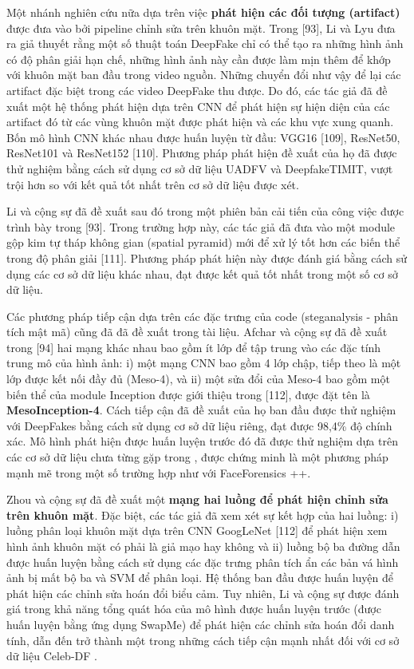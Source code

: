 \documentclass{article}
\begin{document}
Một nhánh nghiên cứu nữa dựa trên việc \textbf{phát hiện các đối tượng (artifact)} được đưa vào bởi pipeline chỉnh sửa trên khuôn mặt. Trong [93], Li và Lyu đưa ra giả thuyết rằng một số thuật toán DeepFake chỉ có thể tạo ra những hình ảnh có độ phân giải hạn chế, những hình ảnh này cần được làm mịn thêm để khớp với khuôn mặt ban đầu trong video nguồn. Những chuyển đổi như vậy để lại các artifact đặc biệt trong các video DeepFake thu được. Do đó, các tác giả đã đề xuất một hệ thống phát hiện dựa trên CNN để phát hiện sự hiện diện của các artifact đó từ các vùng khuôn mặt được phát hiện và các khu vực xung quanh. Bốn mô hình CNN khác nhau được huấn luyện từ đầu: VGG16 [109], ResNet50, ResNet101 và ResNet152 [110]. Phương pháp phát hiện đề xuất của họ đã được thử nghiệm bằng cách sử dụng cơ sở dữ liệu UADFV và DeepfakeTIMIT, vượt trội hơn so với kết quả tốt nhất trên cơ sở dữ liệu được xét.

Li và cộng sự đã đề xuất sau đó trong  một phiên bản cải tiến của công việc được trình bày trong [93]. Trong trường hợp này, các tác giả đã đưa vào một module gộp kim tự tháp không gian (spatial pyramid) mới để xử lý tốt hơn các biến thể trong độ phân giải [111]. Phương pháp phát hiện này được đánh giá bằng cách sử dụng các cơ sở dữ liệu khác nhau, đạt được kết quả tốt nhất trong một số cơ sở dữ liệu.

Các phương pháp tiếp cận dựa trên các đặc trưng của code (steganalysis - phân tích mật mã) cũng đã đã đề xuất trong tài liệu. Afchar và cộng sự đã đề xuất trong [94] hai mạng khác nhau bao gồm ít lớp để tập trung vào các đặc tính trung mô của hình ảnh: i) một mạng CNN bao gồm 4 lớp chập, tiếp theo là một lớp được kết nối đầy đủ (Meso-4), và ii) một sửa đổi của Meso-4 bao gồm một biến thể của module Inception được giới thiệu trong [112], được đặt tên là \textbf{MesoInception-4}. Cách tiếp cận đã đề xuất của họ ban đầu được thử nghiệm với DeepFakes bằng cách sử dụng cơ sở dữ liệu riêng, đạt được 98,4\% độ chính xác. Mô hình phát hiện được huấn luyện trước đó đã được thử nghiệm dựa trên các cơ sở dữ liệu chưa từng gặp trong , được chứng minh là một phương pháp mạnh mẽ trong một số trường hợp như với FaceForensics ++.

Zhou và cộng sự đã đề xuất một \textbf{mạng hai luồng để phát hiện chỉnh sửa trên khuôn mặt}. Đặc biệt, các tác giả đã xem xét sự kết hợp của hai luồng: i) luồng phân loại khuôn mặt dựa trên CNN GoogLeNet [112] để phát hiện xem hình ảnh khuôn mặt có phải là giả mạo hay không và ii) luồng bộ ba đường dẫn được huấn luyện bằng cách sử dụng các đặc trưng phân tích ẩn các bản vá hình ảnh bị mất bộ ba và SVM để phân loại. Hệ thống ban đầu được huấn luyện để phát hiện các chỉnh sửa hoán đổi biểu cảm. Tuy nhiên, Li và cộng sự được đánh giá trong  khả năng tổng quát hóa của mô hình được huấn luyện trước (được huấn luyện bằng ứng dụng SwapMe) để phát hiện các chỉnh sửa hoán đổi danh tính, dẫn đến trở thành một trong những cách tiếp cận mạnh nhất đối với cơ sở dữ liệu Celeb-DF .
\end{document}
